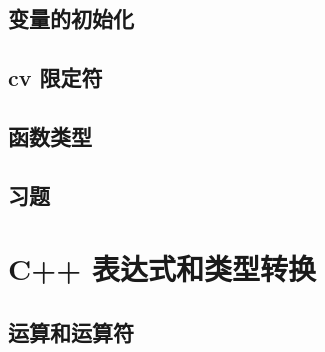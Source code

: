 \documentclass{article}
\begin{document}
	
	
	
	
	\subsection{变量的初始化}
	
	
	
	\subsection{cv 限定符}
	
	\subsection{函数类型}
	
	\subsection{习题}
	
	
	
	
	
	
	
	\section{C++ 表达式和类型转换}
	
	\subsection{运算和运算符}
	
	
\end{document}
